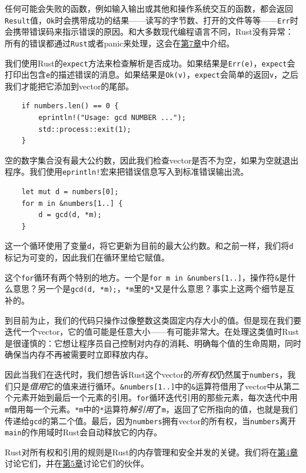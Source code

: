 任何可能会失败的函数，例如输入输出或其他和操作系统交互的函数，都会返回\texttt{Result}值，\texttt{Ok}时会携带成功的结果——读写的字节数、打开的文件等等——\texttt{Err}时会携带错误码来指示错误的原因。和大多数现代编程语言不同，Rust没有异常：所有的错误都通过\texttt{Rust}或者panic来处理，这会在\hyperref[ch07]{第7章}中介绍。

我们使用Rust的\texttt{expect}方法来检查解析是否成功。如果结果是\texttt{Err(e)}，\texttt{expect}会打印出包含\texttt{e}的描述错误的消息。如果结果是\texttt{Ok(v)}，\texttt{expect}会简单的返回\texttt{v}，之后我们才能把它添加到vector的尾部。

\begin{verbatim}
    if numbers.len() == 0 {
        eprintln!("Usage: gcd NUMBER ...");
        std::process::exit(1);
    }
\end{verbatim}

空的数字集合没有最大公约数，因此我们检查vector是否不为空，如果为空就退出程序。我们使用\texttt{eprintln!}宏来把错误信息写入到标准错误输出流。

\begin{verbatim}
    let mut d = numbers[0];
    for m in &numbers[1..] {
        d = gcd(d, *m);
    }
\end{verbatim}

这一个循环使用了变量\texttt{d}，将它更新为目前的最大公约数。和之前一样，我们将\texttt{d}标记为可变的，因此我们在循环里给它赋值。

这个\texttt{for}循环有两个特别的地方。一个是\texttt{for m in \&numbers[1..]}，操作符\texttt{\&}是什么意思？另一个是\texttt{gcd(d, *m);}，\texttt{*m}里的\texttt{*}又是什么意思？事实上这两个细节是互补的。

到目前为止，我们的代码只操作过像整数这类固定内存大小的值。但是现在我们要迭代一个vector，它的值可能是任意大小——有可能非常大。在处理这类值时Rust是很谨慎的：它想让程序员自己控制对内存的消耗、明确每个值的生命周期，同时确保当内存不再被需要时立即释放内存。

因此当我们在迭代时，我们想告诉Rust这个vector的\emph{所有权}仍然属于\texttt{numbers}，我们只是\emph{借用}它的值来进行循环。\texttt{\&numbers[1..]}中的\texttt{\&}运算符借用了vector中从第二个元素开始到最后一个元素的引用。\texttt{for}循环迭代引用的那些元素，每次迭代中用\texttt{m}借用每一个元素。\texttt{*m}中的\texttt{*}运算符\emph{解引用}了\texttt{m}，返回了它所指向的值，也就是我们传递给\texttt{gcd}的第二个值。最后，因为\texttt{numbers}拥有vector的所有权，当\texttt{numbers}离开\texttt{main}的作用域时Rust会自动释放它的内存。

Rust对所有权和引用的规则是Rust的内存管理和安全并发的关键。我们将在\hyperref[ch04]{第4章}讨论它们，并在\hyperref[ch05]{第5章}讨论它们的伙伴。


